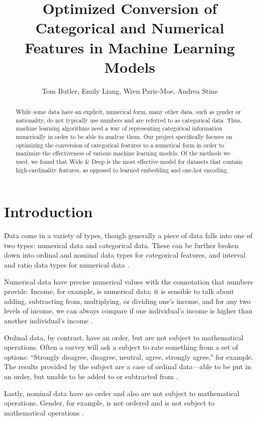 \documentclass[12pt,letterpaper]{article}
\title{Optimized Conversion of Categorical and Numerical Features in Machine Learning Models}
\author{Tom Butler, Emily Liang, Wren Paris-Moe, Andrea Stine}
\theoremstyle{plain}
\theoremstyle{definition}
\begin{document}
\maketitle


\begin{abstract}
While some data have an explicit, numerical form, many other data, such as gender or nationality, do not typically use numbers and are referred to as categorical data. Thus, machine learning algorithms need a way of representing categorical information numerically in order to be able to analyze them. Our project specifically focuses on optimizing the conversion of categorical features to a numerical form in order to maximize the effectiveness of various machine learning models. Of the methods we used, we found that Wide \& Deep is the most effective model for datasets that contain high-cardinality features, as opposed to learned embedding and one-hot encoding. 
\end{abstract}


\section{Introduction}
\hspace{\parindent}Data come in a variety of types, though generally a piece of data falls into one of two types: numerical data and categorical data. These can be further broken down into ordinal and nominal data types for categorical features, and interval and ratio data types for numerical data \cite{datatypes}. 

Numerical data have precise numerical values with the connotation that numbers provide. Income, for example, is numerical data; it is sensible to talk about adding, subtracting from, multiplying, or dividing one's income, and for any two levels of income, we can always compare if one individual's income is higher than another individual's income \cite{numdata}.

Ordinal data, by contrast, have an order, but are not subject to mathematical operations. Often a survey will ask a subject to rate something from a set of options: ``Strongly disagree, disagree, neutral, agree, strongly agree," for example. The results provided by the subject are a case of ordinal data---able to be put in an order, but unable to be added to or subtracted from \cite{categdata}.

Lastly, nominal data have no order and also are not subject to mathematical operations. Gender, for example, is not ordered and is not subject to mathematical operations \cite{categdata}.
\end{document}
